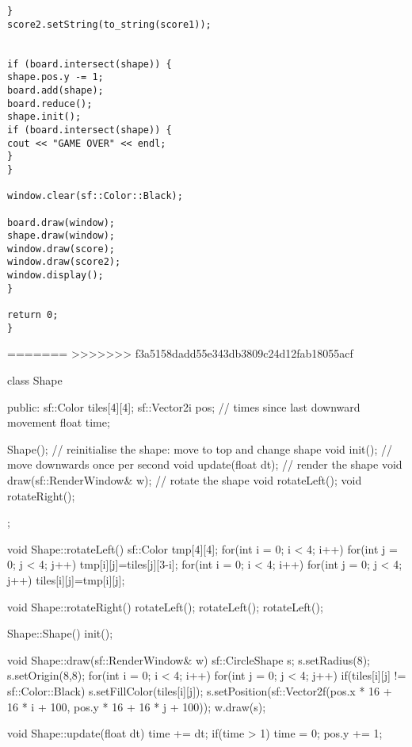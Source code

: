 \documentclass[11pt]{amsart}
\begin{document}
\begin{verbatim}
}
score2.setString(to_string(score1));


if (board.intersect(shape)) {
shape.pos.y -= 1;
board.add(shape);
board.reduce();
shape.init();
if (board.intersect(shape)) {
cout << "GAME OVER" << endl;
}
}

window.clear(sf::Color::Black);

board.draw(window);
shape.draw(window);
window.draw(score);
window.draw(score2);
window.display();
}

return 0;
}

\end{verbatim}


=======
>>>>>>> f3a5158dadd55e343db3809c24d12fab18055acf

	class Shape {
	public:
	    sf::Color tiles[4][4];
	    sf::Vector2i pos;
	    // times since last downward movement
	    float time;

	    Shape();
	    // reinitialise the shape: move to top and change shape
	    void init();
	    // move downwards once per second
	    void update(float dt);
	    // render the shape
	    void draw(sf::RenderWindow& w);
	    // rotate the shape
	    void rotateLeft();
	    void rotateRight();
	};

	void Shape::rotateLeft() {
	    sf::Color tmp[4][4];
	    for(int i = 0; i < 4; i++) {
	        for(int j = 0; j < 4; j++) {
	            tmp[i][j]=tiles[j][3-i];
	        }
	    }
	    for(int i = 0; i < 4; i++) {
	        for(int j = 0; j < 4; j++) {
	            tiles[i][j]=tmp[i][j];
	        }
	    }
	}

	void Shape::rotateRight() {
	    rotateLeft();
	    rotateLeft();
	    rotateLeft();
	}

	Shape::Shape() {
	    init();
	}

	void Shape::draw(sf::RenderWindow& w) {
	    sf::CircleShape s;
	    s.setRadius(8);
	    s.setOrigin(8,8);
	    for(int i = 0; i < 4; i++) {
	        for(int j = 0; j < 4; j++) {
	            if(tiles[i][j] != sf::Color::Black) {
	                s.setFillColor(tiles[i][j]);
	                s.setPosition(sf::Vector2f(pos.x * 16 + 16 * i + 100, pos.y * 16 + 16 * j + 100));
	                w.draw(s);
	            }
	        }
	    }
	}

	void Shape::update(float dt) {
	    time += dt;
	    if(time > 1) {
	        time = 0;
	        pos.y += 1;
	    }
	}
\end{document}
